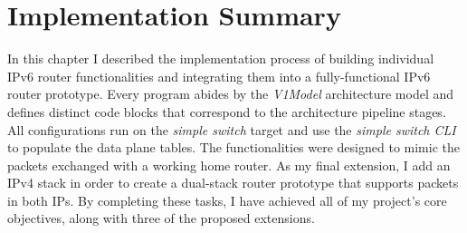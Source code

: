 \section{Implementation Summary}
\label{sec:3.10}

In this chapter I described the implementation process of building individual IPv6 router functionalities and integrating them into a fully-functional IPv6 router prototype. Every program abides by the \textit{V1Model} architecture model and defines distinct code blocks that correspond to the architecture pipeline stages. All configurations run on the \textit{simple switch} target and use the \textit{simple switch CLI} to populate the data plane tables. The functionalities were designed to mimic the packets exchanged with a working home router. As my final extension, I add an IPv4 stack in order to create a dual-stack router prototype that supports packets in both IPs. By completing these tasks, I have achieved all of my project's core objectives, along with three of the proposed extensions.